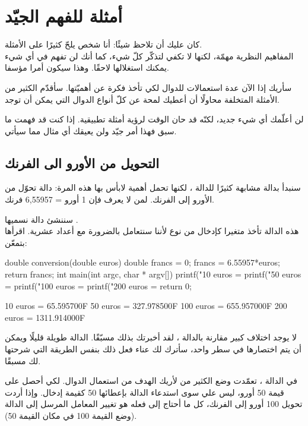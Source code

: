 \section{أمثلة للفهم الجيّد}

كان عليك أن تلاحظ شيئًا: أنا شخص يلحّ كثيرًا على الأمثلة.\\
المفاهيم النظرية مهمّة، لكنها لا تكفي لتذكّر كلّ شيء، كما أنك لن تفهم في أي شيء يمكنك استغلالها لاحقًا. وهذا سيكون أمرا مؤسفا.

سأريك إذا الآن عدة استعمالات للدوال لكي تأخذ فكرة عن أهميّتها. سأقدّم الكثير من الأمثلة المتخلفة محاولًا أن أعطيك لمحة عن كلّ أنواع الدوال التي يمكن أن توجد.

لن أعلّمك أي شيء جديد، لكنّه قد حان الوقت لرؤية أمثلة تطبيقية. إذا كنت قد فهمت ما سبق فهذا أمر جيّد ولن يعيقك أي مثال مما سيأتي.

\subsection{التحويل من الأورو الى الفرنك}

سنبدأ بدالة مشابهة كثيرًا للدالة
،
لكنها تحمل أهمية لابأس بها هذه المرة: دالة تحوّل من الأورو إلى الفرنك. لمن لا يعرف فإن 1 أورو = 6,55957 فرنك.

سننشئ دالة نسميها 
.\\
هذه الدالة تأخذ متغيرا كإدخال من نوع 
لأننا سنتعامل بالضرورة مع أعداد عشرية. اقرأها بتمعّن:

\begin{Csource}
double conversion(double euros)
{
	double francs = 0;
	francs = 6.55957*euros;
	return francs;
}
int main(int argc, char * argv[])
{
	printf("10 euros = %
	printf("50 euros = %
	printf("100 euros = %
	printf("200 euros = %
	return 0;
}
\end{Csource}

\begin{Console}
10 euros = 65.595700F
50 euros = 327.978500F
100 euros = 655.957000F
200 euros = 1311.914000F
\end{Console}

لا يوجد اختلاف كبير مقارنة بالدالة 
،
لقد أخبرتك بذلك مسبّقًا. الدالة 
طويلة قليلًا ويمكن أن يتم اختصارها في سطر واحد، سأترك لك عناء فعل ذلك بنفس الطريقة التي شرحتها لك مسبقًا.

في الدالة
،
تعمّدت وضع الكثير من
لأريك الهدف من استعمال الدوال. لكي أحصل على قيمة 50 أورو، ليس علي سوى استدعاء الدالة 
بإعطائها 50 كقيمة إدخال. وإذا أردت تحويل 100 أورو إلى الفرنك، كل ما أحتاج إلى فعله هو تغيير المعامل المرسل إلى الدالة (وضع القيمة 100 في مكان القيمة 50).

